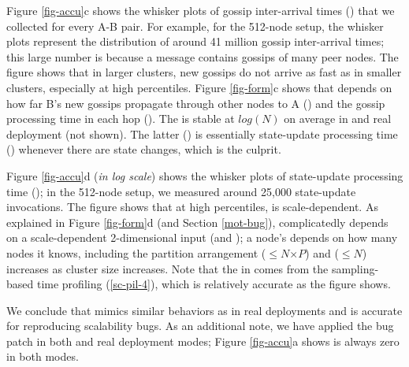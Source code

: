 

Figure \ref{fig-accu}c shows the whisker plots of gossip inter-arrival
times (\gosLast) that we collected for every A-B pair.  For example, for the
512-node setup, the whisker plots represent the distribution of 
around 41 million 
gossip inter-arrival times; this large number is because a message
contains gossips of many peer nodes.  The figure shows that in larger
clusters, new gossips do not arrive as fast as in smaller clusters,
especially at high percentiles.
%
Figure \ref{fig-form}c shows that \gosLast depends on how far B's new
gossips propagate through other nodes to A (\hops) and the gossip
processing time in each hop (\gosProc).  The \hops is stable
at $log(N)$ on average in \sck and real deployment (not shown).  The
latter (\gosProc) is essentially state-update processing time (\supProc)
whenever there are state changes, which is the culprit.

Figure \ref{fig-accu}d ({\em in log scale}) shows the whisker plots of
state-update processing time (\supProc); in the 512-node setup, we
measured around 25,000 state-update invocations.  The figure shows that at high
percentiles, \supProc is scale-dependent.  As explained in 
Figure \ref{fig-form}d (and Section \ref{mot-bug}), \supProc complicatedly
depends on a scale-dependent 2-dimensional input (\ringTable and
\newStates); a node's \ringTable depends on how many nodes it knows,
including the partition arrangement ($\leq$$N$$\times$$P$) and \newStates
($\leq$$N$) increases as cluster size increases.
%
%
Note that the \supProc in \sck comes from the sampling-based time
profiling (\sec\ref{sc-pil-4}), which is relatively accurate as the figure
shows.



We conclude that \sck mimics similar behaviors as in real deployments and
is accurate for reproducing scalability bugs.
%
As an additional note, we have applied the bug patch in both \sck and real
deployment modes;  Figure \ref{fig-accu}a shows \flaps is always zero in
both modes.



